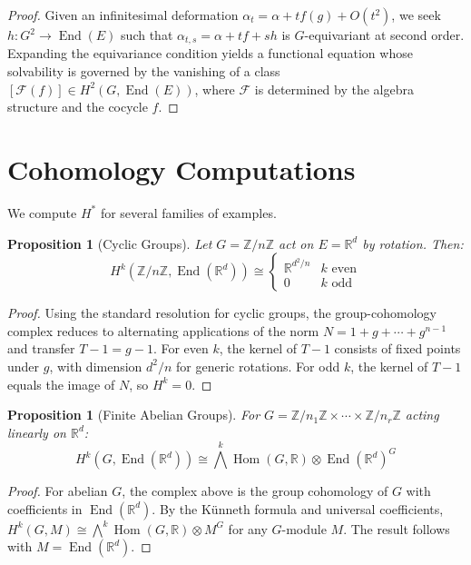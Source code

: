 \documentclass[11pt,a4paper,openany]{book}
\theoremstyle{plain}
\newtheorem{proposition}[theorem]{Proposition}
\theoremstyle{definition}
\newcommand{\actspace}{E}
\newcommand{\groupG}{G}
\newcommand{\RR}{\mathbb{R}}
\newcommand{\ZZ}{\mathbb{Z}}
\DeclareMathOperator{\End}{End}
\DeclareMathOperator{\Hom}{Hom}
\begin{document}
\begin{proof}
Given an infinitesimal deformation $\alpha_t = \alpha + tf(g) + O(t^2)$, we seek $h : \groupG^2 \to \End(\actspace)$ such that $\alpha_{t,s} = \alpha + tf + sh$ is $\groupG$-equivariant at second order. Expanding the equivariance condition yields a functional equation whose solvability is governed by the vanishing of a class $[\mathcal{F}(f)] \in H^2(\groupG, \End(\actspace))$, where $\mathcal{F}$ is determined by the algebra structure and the cocycle $f$.
\end{proof}

\section{Cohomology Computations}\label{sec:cohom-computations}

We compute $H^\ast$ for several families of examples.

\begin{proposition}[Cyclic Groups]\label{prop:cyclic-cohom}
Let $\groupG = \ZZ/n\ZZ$ act on $\actspace = \RR^d$ by rotation. Then:
\[
H^k(\ZZ/n\ZZ, \End(\RR^d)) \cong
\begin{cases}
\RR^{d^2/n} & k \text{ even}\\
0 & k \text{ odd}
\end{cases}
\]
\end{proposition}

\begin{proof}
Using the standard resolution for cyclic groups, the group-cohomology complex reduces to alternating applications of the norm $N = 1 + g + \cdots + g^{n-1}$ and transfer $T - 1 = g - 1$. For even $k$, the kernel of $T - 1$ consists of fixed points under $g$, with dimension $d^2/n$ for generic rotations. For odd $k$, the kernel of $T - 1$ equals the image of $N$, so $H^k = 0$.
\end{proof}

\begin{proposition}[Finite Abelian Groups]\label{prop:abelian-cohom}
For $\groupG = \ZZ/n_1\ZZ \times \cdots \times \ZZ/n_r\ZZ$ acting linearly on $\RR^d$:
\[
H^k(\groupG, \End(\RR^d)) \cong \textstyle\bigwedge^k \Hom(\groupG, \RR) \otimes \End(\RR^d)^\groupG
\]
\end{proposition}

\begin{proof}
For abelian $\groupG$, the complex above is the group cohomology of $\groupG$ with coefficients in $\End(\RR^d)$. By the K\"unneth formula and universal coefficients, $H^k(\groupG, M) \cong \bigwedge^k \Hom(\groupG, \RR) \otimes M^\groupG$ for any $\groupG$-module $M$. The result follows with $M = \End(\RR^d)$.
\end{proof}
\end{document}
